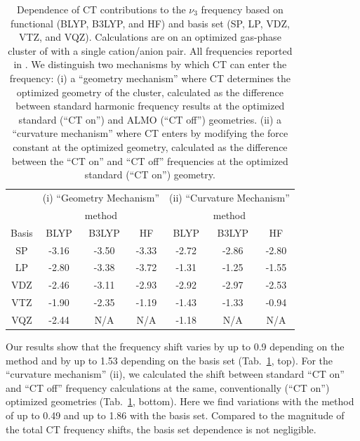 \documentclass[%
  class = book,%
  crop = false,%
  float = true,%
  multi = true,%
  preview = false,%
]{standalone}
\begin{document}
\begin{table}
  \centering
  \caption[Charge transfer dependence of \texorpdfstring{ \(\nu_3\)}{carbon dioxide asymmetric stretch} frequencies]{Dependence of CT contributions to the \(\nu_3\) frequency based on functional (BLYP, B3LYP, and HF) and basis set (SP, LP, VDZ, VTZ, and VQZ). Calculations are on an optimized gas-phase cluster of  with a single cation/anion pair. All frequencies reported in \si{\wavenumber}. We distinguish two mechanisms by which CT can enter the frequency: (i) a ``geometry mechanism'' where CT determines the optimized geometry of the cluster, calculated as the difference between standard harmonic frequency results at the optimized standard (``CT on'') and ALMO (``CT off'') geometries. (ii) a ``curvature mechanism'' where CT enters by modifying the force constant at the optimized geometry, calculated as the difference between the ``CT on'' and ``CT off'' frequencies at the optimized standard (``CT on'') geometry.}
  \label{paper_02:tab:3}
  \begin{tabular}{ccccccc}
    \toprule
    & \multicolumn{3}{c}{(i) ``Geometry Mechanism''} & \multicolumn{3}{c}{(ii) ``Curvature Mechanism''} \\
    & \multicolumn{3}{c}{method} & \multicolumn{3}{c}{method} \\
    \cmidrule{2-4}\cmidrule{5-7}
    Basis & BLYP & B3LYP & HF & BLYP & B3LYP & HF \\
    \midrule
    SP  & -3.16 & -3.50 & -3.33 & -2.72 & -2.86 & -2.80 \\
    LP  & -2.80 & -3.38 & -3.72 & -1.31 & -1.25 & -1.55 \\
    VDZ & -2.46 & -3.11 & -2.93 & -2.92 & -2.97 & -2.53 \\
    VTZ & -1.90 & -2.35 & -1.19 & -1.43 & -1.33 & -0.94 \\
    VQZ & -2.44 & N/A   & N/A   & -1.18 & N/A   & N/A \\
    \bottomrule
  \end{tabular}
\end{table}

Our results show that the frequency shift varies by up to \SI{0.9}{\wavenumber} depending on the method and by up to \SI{1.53}{\wavenumber} depending on the basis set (Tab.~\ref{paper_02:tab:3}, top). For the ``curvature mechanism'' (ii), we calculated the shift between standard ``CT on'' and ``CT off'' frequency calculations at the same, conventionally (``CT on'') optimized geometries (Tab.~\ref{paper_02:tab:3}, bottom). Here we find variations with the method of up to \SI{0.49}{\wavenumber} and up to \SI{1.86}{\wavenumber} with the basis set. Compared to the magnitude of the total CT frequency shifts, the basis set dependence is not negligible.
\end{document}
